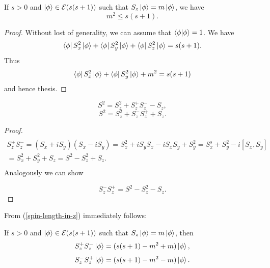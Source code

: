 \documentclass[main.tex]{subfiles}
\begin{document}
\begin{fact}
If $s > 0$ and $\ket{\phi} \in \mathcal{E}(s(s + 1))$ such that $S_z\ket{\phi} = m\ket{\phi}$, we have
\begin{equation}
m^2 \leq s(s + 1).
\end{equation}
\end{fact}
\begin{proof}
Without lost of generality, we can assume that $\bra{\phi}\ket{\phi} = 1$.
We have
\begin{equation}
\bra{\phi}S^2_x\ket{\phi} + \bra{\phi}S^2_y\ket{\phi} + \bra{\phi}S^2_z\ket{\phi} = s(s + 1).
\end{equation}
Thus
\begin{equation}
\bra{\phi}S^2_x\ket{\phi} + \bra{\phi}S^2_y\ket{\phi} + m^2 = s(s + 1)
\end{equation}
and hence thesis.
\end{proof}

\begin{fact}
\label{spin-length-in-z}
\begin{equation}
S^2 = S^2_z + S_z^{+}S_z^{-} - S_z,
\end{equation}
\begin{equation}
S^2 = S^2_z + S_z^{-}S_z^{+} + S_z.
\end{equation}
\end{fact}
\begin{proof}
\begin{multline*}
\\S^{+}_zS^{-}_z = (S_x + iS_y)(S_x - i S_y) = S^2_x + iS_y S_x - iS_x S_y + S^2_y = 
S^s_x + S^2_y - i[S_x, S_y]\\
=S^2_x + S^2_y + S_z = S^2 - S^2_z + S_z.\\
\end{multline*}
Analogously we can show

\begin{equation}
S^{-}_zS^{+}_z = S^2 - S^2_z - S_z.
\end{equation}
\end{proof}

From (\ref{spin-length-in-z}) immediately follows:

\begin{fact}
If $s > 0$ and $\ket{\phi} \in \mathcal{E}(s(s + 1))$ such that $S_z\ket{\phi} = m\ket{\phi}$, then
\begin{equation}
S_z^{+}S_z^{-}\ket{\phi} = (s(s+1) - m^2 + m)\ket{\phi},
\end{equation}
\begin{equation}
S_z^{-}S_z^{+}\ket{\phi} = (s(s+1) - m^2 - m)\ket{\phi}.
\end{equation}
\end{fact}
\end{document}
